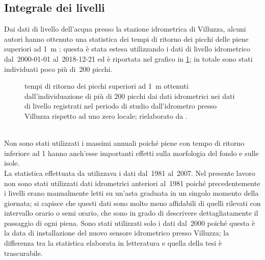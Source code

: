 \subsection{Integrale dei livelli}
Dai dati di livello dell'acqua presso la stazione idrometrica di Villuzza, alcuni autori hanno ottenuto una statistica dei tempi di ritorno dei picchi delle piene superiori ad \SI{1}{\m} ; questa è stata estesa utilizzando i dati di livello idrometrico dal~2000-01-01 al~2018-12-21 ed è riportata nel grafico in \cref{graph:tr-picchi}; in totale sono stati individuati poco più di~200 picchi.
%
\begin{figure}
	\centering
	
	\caption[tempi di ritorno dei picchi superiori ad \SI{1}{\m}]{tempi di ritorno dei picchi superiori ad \SI{1}{\m} ottenuti dall'individuazione di più di 200 picchi dai dati idrometrici nei dati di livello registrati nel periodo di studio dall'idrometro presso Villuzza rispetto ad uno zero locale; rielaborato da .}
	\label{graph:tr-picchi}
\end{figure}
%
\\
Non sono stati utilizzati i massimi annuali poiché piene con tempo di ritorno inferiore ad \SI{1}{\anno} hanno anch'esse importanti effetti sulla morfologia del fondo e sulle isole.
\\
La statistica effettuata da  utilizzava i dati dal~1981 al~2007.
Nel presente lavoro non sono stati utilizzati dati idrometrici anteriori al~1981 poiché precedentemente i livelli erano manualmente letti su un'asta graduata in un singolo momento della giornata; si capisce che questi dati sono molto meno affidabili di quelli rilevati con intervallo orario o semi orario, che sono in grado di descrivere dettagliatamente il passaggio di ogni piena.
Sono stati utilizzati solo i dati dal~2000 poiché questa è la data di installazione del nuovo sensore idrometrico presso Villuzza; la differenza tra la statistica elaborata in letteratura e quella della tesi è trascurabile.

